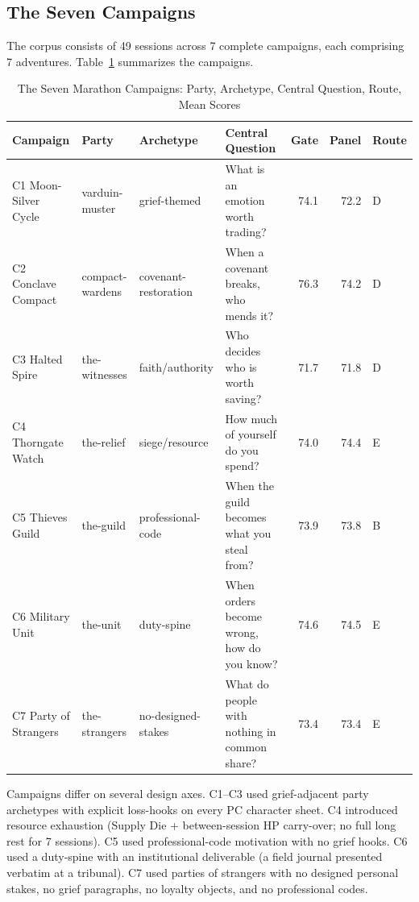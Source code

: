 \subsection{The Seven Campaigns}

The corpus consists of 49 sessions across 7 complete campaigns, each comprising
7 adventures. Table~\ref{tab:campaigns} summarizes the campaigns.

\begin{table}[t]
\caption{The Seven Marathon Campaigns: Party, Archetype, Central Question, Route, Mean Scores}
\label{tab:campaigns}
\begin{tabular}{@{}llllrrl@{}}
\toprule
Campaign & Party & Archetype & Central Question & Gate & Panel & Route \\
\midrule
C1 Moon-Silver Cycle & varduin-muster & grief-themed & What is an emotion worth trading? & 74.1 & 72.2 & D \\
C2 Conclave Compact & compact-wardens & covenant-restoration & When a covenant breaks, who mends it? & 76.3 & 74.2 & D \\
C3 Halted Spire & the-witnesses & faith/authority & Who decides who is worth saving? & 71.7 & 71.8 & D \\
C4 Thorngate Watch & the-relief & siege/resource & How much of yourself do you spend? & 74.0 & 74.4 & E \\
C5 Thieves Guild & the-guild & professional-code & When the guild becomes what you steal from? & 73.9 & 73.8 & B \\
C6 Military Unit & the-unit & duty-spine & When orders become wrong, how do you know? & 74.6 & 74.5 & E \\
C7 Party of Strangers & the-strangers & no-designed-stakes & What do people with nothing in common share? & 73.4 & 73.4 & E \\
\bottomrule
\end{tabular}
\end{table}

Campaigns differ on several design axes. C1--C3 used grief-adjacent party archetypes
with explicit loss-hooks on every PC character sheet. C4 introduced resource exhaustion
(Supply Die + between-session HP carry-over; no full long rest for 7 sessions). C5
used professional-code motivation with no grief hooks. C6 used a duty-spine with an
institutional deliverable (a field journal presented verbatim at a tribunal). C7 used
parties of strangers with no designed personal stakes, no grief paragraphs, no loyalty
objects, and no professional codes.

